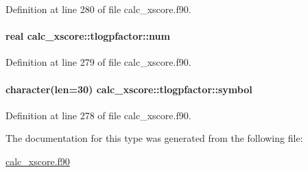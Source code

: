 Definition at line 280 of file calc\-\_\-xscore.\-f90.

\hypertarget{structcalc__xscore_1_1tlogpfactor_a625e8a8380e98e1c0c4ff615ec9b183b}{
\paragraph[{num}]{\setlength{\rightskip}{0pt plus 5cm}real calc\-\_\-xscore\-::tlogpfactor\-::num}}\label{structcalc__xscore_1_1tlogpfactor_a625e8a8380e98e1c0c4ff615ec9b183b}


Definition at line 279 of file calc\-\_\-xscore.\-f90.

\hypertarget{structcalc__xscore_1_1tlogpfactor_a19a3c46be66380c108d9fd7191dce5bb}{
\paragraph[{symbol}]{\setlength{\rightskip}{0pt plus 5cm}character(len=30) calc\-\_\-xscore\-::tlogpfactor\-::symbol}}\label{structcalc__xscore_1_1tlogpfactor_a19a3c46be66380c108d9fd7191dce5bb}


Definition at line 278 of file calc\-\_\-xscore.\-f90.



The documentation for this type was generated from the following file\-:\begin{DoxyCompactItemize}
\item 
\hyperlink{calc__xscore_8f90}{calc\-\_\-xscore.\-f90}\end{DoxyCompactItemize}
